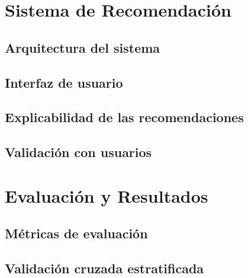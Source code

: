 \documentclass[12pt, a4paper]{article}
\begin{document}
\section{Sistema de Recomendación}
\label{sec:sistema}

\subsection{Arquitectura del sistema}

\subsection{Interfaz de usuario}

\subsection{Explicabilidad de las recomendaciones}

\subsection{Validación con usuarios}

\section{Evaluación y Resultados}
\label{sec:resultados}

\subsection{Métricas de evaluación}

\subsection{Validación cruzada estratificada}
\end{document}
